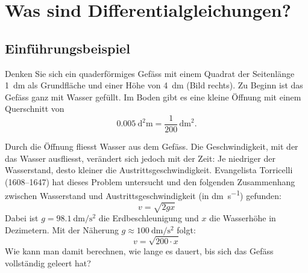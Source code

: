 \section{Was sind Differentialgleichungen?}

\subsection{Einführungsbeispiel}

\begin{minipage}[t]{0.76\textwidth}
    \vspace{0pt}
    Denken Sie sich ein quaderförmiges Gefäss mit einem
    Quadrat der Seitenlänge \SI{1}{\deci\meter} als
    Grundfläche und einer Höhe von \SI{4}{\deci\meter}
    (Bild rechts). Zu Beginn ist das Gefäss ganz mit
    Wasser gefüllt. Im Boden gibt es eine kleine Öffnung
    mit einem Querschnitt von
    \[
        \SI{0.005}{\square\deci\meter}
        = \frac{1}{200}\,\mathrm{dm}^2.
    \]
\end{minipage}
\hfill
\begin{minipage}[t]{0.21\textwidth}
    \vspace{0pt}
    \centering
\end{minipage}

Durch die Öffnung fliesst Wasser aus dem Gefäss.
Die Geschwindigkeit, mit der das Wasser ausfliesst,
verändert sich jedoch mit der Zeit: Je niedriger
der Wasserstand, desto kleiner die Austrittsgeschwindigkeit.
Evangelista Torricelli (1608--1647) hat dieses Problem
untersucht und den folgenden Zusammenhang zwischen
Wasserstand und Austrittsgeschwindigkeit
(in \si{\deci\meter\per\second}) gefunden:
\[
    v = \sqrt{2gx}
\]
Dabei ist \(g=\SI{98.1}{\deci\meter\per\second\squared}\)
die Erdbeschleunigung und \(x\) die Wasserhöhe in
Dezimetern. Mit der Näherung
\(g\approx\SI{100}{\deci\meter\per\second\squared}\)
folgt:
\[
    v = \sqrt{200\cdot x}
\]
Wie kann man damit berechnen, wie lange es dauert,
bis sich das Gefäss vollständig geleert hat?

